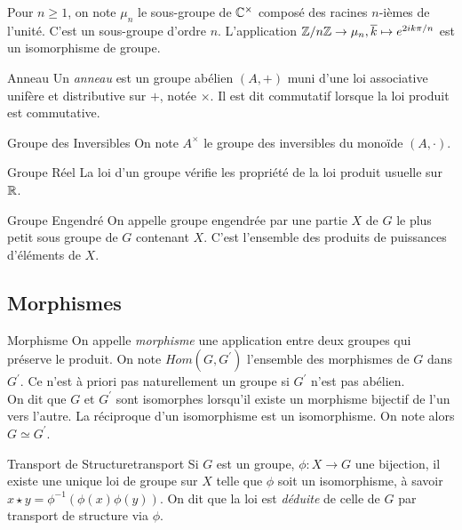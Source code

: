 \documentclass{cours}
\begin{document}
\begin{example}
    Pour $n \geq 1$, on note $\mu_{n}$ le sous-groupe de $\mathbb{C}^{\times}$ composé des racines $n$-ièmes de l'unité. C'est un sous-groupe d'ordre $n$. L'application $\mathbb{Z}/n\mathbb{Z} \rightarrow \mu_{n}, \overline{k} \mapsto e^{2ik\pi/n}$ est un isomorphisme de groupe.
\end{example}

\begin{définition}{Anneau}{}
    Un \emph{anneau} est un groupe abélien $(A, +)$ muni d'une loi associative unifère et distributive sur $+$, notée $\times$. Il est dit commutatif lorsque la loi produit est commutative.
\end{définition}

\begin{définition}{Groupe des Inversibles}{}
    On note $A^{\times}$ le groupe des inversibles du monoïde $(A, \cdot)$.
\end{définition}

\begin{propositionfr}{Groupe Réel}{}
    La loi d'un groupe vérifie les propriété de la loi produit usuelle sur $\mathbb{R}$.
\end{propositionfr}

\begin{définition}{Groupe Engendré}{}
    On appelle groupe engendrée par une partie $X$ de $G$ le plus petit sous groupe de $G$ contenant $X$. C'est l'ensemble des produits de puissances d'éléments de $X$.
\end{définition}

\subsection{Morphismes}
\begin{définition}{Morphisme}{}
    On appelle \emph{morphisme} une application entre deux groupes qui préserve le produit. On note $Hom(G, G^{'})$ l'ensemble des morphismes de $G$ dans $G^{'}$. Ce n'est à priori pas naturellement un groupe si $G^{'}$ n'est pas abélien.  \\
    On dit que $G$ et $G^{'}$ sont isomorphes lorsqu'il existe un morphisme bijectif de l'un vers l'autre. La réciproque d'un isomorphisme est un isomorphisme. On note alors $G \simeq G^{'}$.
\end{définition}

\begin{propositionfr}{Transport de Structure}{transport}
    Si $G$ est un groupe, $\phi : X \rightarrow G$ une bijection, il existe une unique loi de groupe sur $X$ telle que $\phi$ soit un isomorphisme, à savoir $x \star y = \phi^{-1}(\phi(x)\phi(y))$. On dit que la loi est \emph{déduite} de celle de $G$ par transport de structure via $\phi$.
\end{propositionfr}
\end{document}
